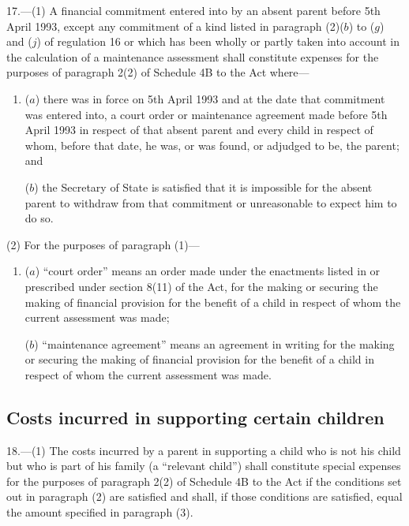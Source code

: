 \documentclass[a4paper]{article}
\begin{document}
17.—(1) A financial commitment entered into by an
absent parent before 5th April 1993, except any commitment of a kind listed in
paragraph (2)($b$) to ($g$) and ($j$) of regulation 16 or which has been wholly or
partly taken into account in the calculation of a maintenance assessment shall
constitute expenses for the purposes of paragraph 2(2) of Schedule 4B to the Act
where—
\begin{enumerate}\item[]
($a$) there was in force on 5th April 1993 and at the date that commitment was
entered into, a court order or maintenance agreement made before 5th April 1993
in respect of that absent parent and every child in respect of whom, before that
date, he was, or was found, or adjudged to be, the parent; and

($b$) the Secretary of State is satisfied that it is impossible for the absent
parent to withdraw from that commitment or unreasonable to expect him to do so.
\end{enumerate}

(2) For the purposes of paragraph (1)—
\begin{enumerate}\item[]
($a$) “court order” means an order made under the enactments listed in or
prescribed under section 8(11) of the Act, for the making or securing the making
of financial provision for the benefit of a child in respect of whom the current
assessment was made;

($b$) “maintenance agreement” means an agreement in writing for the making or
securing the making of financial provision for the benefit of a child in respect
of whom the current assessment was made.
\end{enumerate}

\subsection[18. Costs incurred in supporting certain children]{Costs incurred in supporting certain children}

18.—(1) The costs incurred by a
parent in supporting a child who is not his child but who is part of his family
(a “relevant child”) shall constitute special expenses for the purposes of
paragraph 2(2) of Schedule 4B to the Act if the conditions set out in paragraph
(2) are satisfied and shall, if those conditions are satisfied, equal the amount
specified in paragraph (3).
\end{document}
